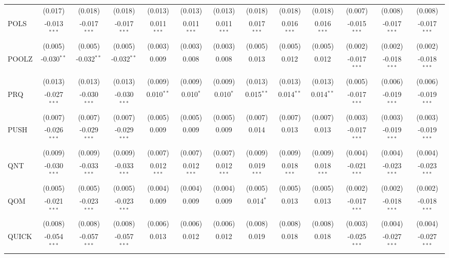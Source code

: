 \begin{table}[!htbp]
\begin{tabular}{@{\extracolsep{5pt}}lcccccccccccc}
  & (0.017) & (0.018) & (0.018) & (0.013) & (0.013) & (0.013) & (0.018) & (0.018) & (0.018) & (0.007) & (0.008) & (0.008) \\
 POLS & -0.013$^{***}$ & -0.017$^{***}$ & -0.017$^{***}$ & 0.011$^{***}$ & 0.011$^{***}$ & 0.011$^{***}$ & 0.017$^{***}$ & 0.016$^{***}$ & 0.016$^{***}$ & -0.015$^{***}$ & -0.017$^{***}$ & -0.017$^{***}$ \\
  & (0.005) & (0.005) & (0.005) & (0.003) & (0.003) & (0.003) & (0.005) & (0.005) & (0.005) & (0.002) & (0.002) & (0.002) \\
 POOLZ & -0.030$^{**}$ & -0.032$^{**}$ & -0.032$^{**}$ & 0.009$^{}$ & 0.008$^{}$ & 0.008$^{}$ & 0.013$^{}$ & 0.012$^{}$ & 0.012$^{}$ & -0.017$^{***}$ & -0.018$^{***}$ & -0.018$^{***}$ \\
  & (0.013) & (0.013) & (0.013) & (0.009) & (0.009) & (0.009) & (0.013) & (0.013) & (0.013) & (0.005) & (0.006) & (0.006) \\
 PRQ & -0.027$^{***}$ & -0.030$^{***}$ & -0.030$^{***}$ & 0.010$^{**}$ & 0.010$^{*}$ & 0.010$^{*}$ & 0.015$^{**}$ & 0.014$^{**}$ & 0.014$^{**}$ & -0.017$^{***}$ & -0.019$^{***}$ & -0.019$^{***}$ \\
  & (0.007) & (0.007) & (0.007) & (0.005) & (0.005) & (0.005) & (0.007) & (0.007) & (0.007) & (0.003) & (0.003) & (0.003) \\
 PUSH & -0.026$^{***}$ & -0.029$^{***}$ & -0.029$^{***}$ & 0.009$^{}$ & 0.009$^{}$ & 0.009$^{}$ & 0.014$^{}$ & 0.013$^{}$ & 0.013$^{}$ & -0.017$^{***}$ & -0.019$^{***}$ & -0.019$^{***}$ \\
  & (0.009) & (0.009) & (0.009) & (0.007) & (0.007) & (0.007) & (0.009) & (0.009) & (0.009) & (0.004) & (0.004) & (0.004) \\
 QNT & -0.030$^{***}$ & -0.033$^{***}$ & -0.033$^{***}$ & 0.012$^{***}$ & 0.012$^{***}$ & 0.012$^{***}$ & 0.019$^{***}$ & 0.018$^{***}$ & 0.018$^{***}$ & -0.021$^{***}$ & -0.023$^{***}$ & -0.023$^{***}$ \\
  & (0.005) & (0.005) & (0.005) & (0.004) & (0.004) & (0.004) & (0.005) & (0.005) & (0.005) & (0.002) & (0.002) & (0.002) \\
 QOM & -0.021$^{***}$ & -0.023$^{***}$ & -0.023$^{***}$ & 0.009$^{}$ & 0.009$^{}$ & 0.009$^{}$ & 0.014$^{*}$ & 0.013$^{}$ & 0.013$^{}$ & -0.017$^{***}$ & -0.018$^{***}$ & -0.018$^{***}$ \\
  & (0.008) & (0.008) & (0.008) & (0.006) & (0.006) & (0.006) & (0.008) & (0.008) & (0.008) & (0.003) & (0.004) & (0.004) \\
 QUICK & -0.054$^{***}$ & -0.057$^{***}$ & -0.057$^{***}$ & 0.013$^{}$ & 0.012$^{}$ & 0.012$^{}$ & 0.019$^{}$ & 0.018$^{}$ & 0.018$^{}$ & -0.025$^{***}$ & -0.027$^{***}$ & -0.027$^{***}$ \\

\end{tabular}
\end{table}
